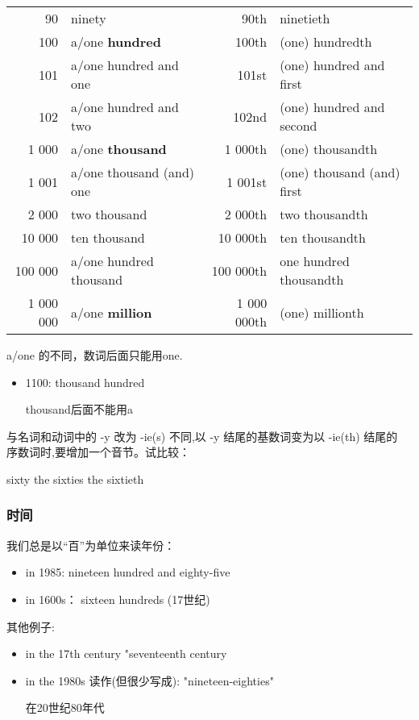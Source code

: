 \begin{table}[tp!]
\begin{tabular}[hp!]{rlrl}
    90        & ninety                   & 90th        & ninetieth                  \\
    100       & a/one \textbf{hundred}         & 100th       & (one) hundredth            \\
    101       & a/one hundred and one    & 101st       & (one) hundred and first    \\
    102       & a/one hundred and two    & 102nd       & (one) hundred and second   \\
    1 000     & a/one \textbf{thousand}        & 1 000th     & (one) thousandth           \\
    1 001     & a/one thousand (and) one & 1 001st     & (one) thousand (and) first \\
    2 000     & two thousand             & 2 000th     & two thousandth             \\
    10 000    & ten thousand             & 10 000th    & ten thousandth             \\
    100 000   & a/one hundred thousand   & 100 000th   & one hundred thousandth     \\
    1 000 000 & a/one \textbf{million}         & 1 000 000th & (one) millionth            \\
    \bottomrule
  \end{tabular}
\end{table}

a/one 的不同，数词后面只能用one.
\begin{itemize}
\item 1100:  thousand  hundred

  thousand后面不能用a
\end{itemize}

与名词和动词中的 -y 改为 -ie(s) 不同,以 -y 结尾的基数词变为以 -ie(th) 结尾的
序数词时,要增加一个音节。试比较：

sixty \qquad the sixties \qquad the sixtieth

\subsubsection{时间}

我们总是以“百”为单位来读年份：
\begin{itemize}
\item in 1985: nineteen hundred and eighty-five
\item in 1600s： sixteen hundreds (17世纪)
\end{itemize}
其他例子:
\begin{itemize}
\item in the 17th century "seventeenth century

\item in the 1980s 读作(但很少写成): "nineteen-eighties"

  在20世纪80年代
\end{itemize}

